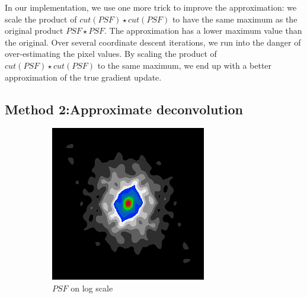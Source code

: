 In our implementation, we use one more trick to improve the approximation: we scale the product of $cut(PSF) \star cut(PSF)$ to have the same maximum as the original product $PSF \star PSF$. The approximation has a lower maximum value than the original. Over several coordinate descent iterations, we run into the danger of over-estimating the pixel values. By scaling the product of $cut(PSF) \star cut(PSF)$ to the same maximum, we end up with a better approximation of the true gradient update.

\subsection{Method 2:Approximate deconvolution}
\begin{figure}[h]
	\centering
	\begin{subfigure}[b]{0.3\linewidth}
		\includegraphics[width=\linewidth]{./chapters/03.distribution/simulated/psf.png}
		\caption{$PSF$ on log scale}
	\end{subfigure}
	\begin{subfigure}[b]{0.3\linewidth}

\end{subfigure}
\end{figure}
